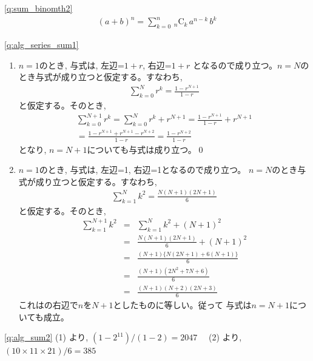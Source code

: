 \ref{q:sum_binomth2} 
\begin{eqnarray}
(a+b)^n=\sum_{k=0}^n \,_n\text{C}_k\,a^{n-k}\,b^k
\end{eqnarray}


\ref{q:alg_series_sum1} 
\begin{enumerate}
\item $n=1$のとき, 与式は, 左辺=$1+r$, 右辺=$1+r$
となるので成り立つ。$n=N$のとき与式が成り立つと仮定する。すなわち, 
\begin{eqnarray}
\sum_{k=0}^N r^k=\frac{1-r^{N+1}}{1-r}\label{eq:sum_touhi_ans2}
\end{eqnarray}
と仮定する。そのとき, 
\begin{eqnarray*}
\sum_{k=0}^{N+1} r^k=\sum_{k=0}^{N} r^k+r^{N+1}=\frac{1-r^{N+1}}{1-r}+r^{N+1}\\
= \frac{1-r^{N+1}+r^{N+1}-r^{N+2}}{1-r} = \frac{1-r^{N+2}}{1-r}
\end{eqnarray*}
となり, $n=N+1$についても与式は成り立つ。\qed
\item $n=1$のとき, 与式は, 左辺=1, 右辺=1となるので成り立つ。
$n=N$のとき与式が成り立つと仮定する。すなわち, 
\begin{eqnarray*}
\sum_{k=1}^N k^2=\frac{N(N+1)(2N+1)}{6}
\end{eqnarray*}
と仮定する。そのとき, 
\begin{eqnarray*}
\sum_{k=1}^{N+1} k^2 & = & \sum_{k=1}^{N} k^2+(N+1)^2\\
        & = & \frac{N(N+1)(2N+1)}{6}+(N+1)^2\\
        & = & \frac{(N+1)\{N(2N+1)+6(N+1)\}}{6}\\
        & = & \frac{(N+1)(2N^2+7N+6)}{6}\\
        & = & \frac{(N+1)(N+2)(2N+3)}{6}
\end{eqnarray*}
これはの右辺で$n$を$N+1$としたものに等しい。従って
与式は$n=N+1$についても成立。
\end{enumerate}

\ref{q:alg_sum2} 
(1) より, $(1-2^{11})/(1-2)=2047$　
(2) より, $(10\times11\times21)/6=385$

